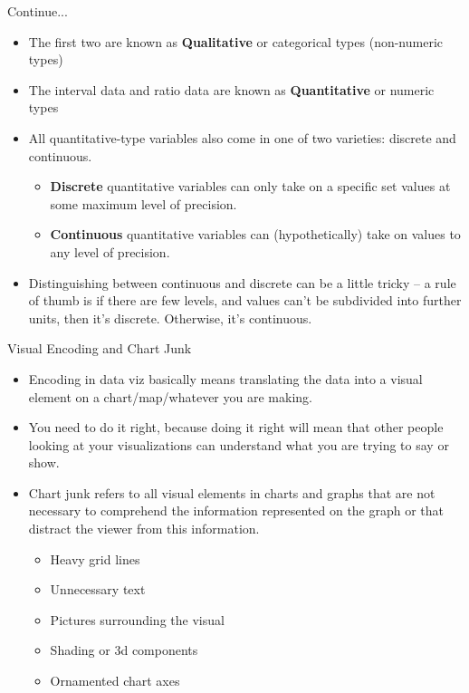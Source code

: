 \documentclass[12pt]{beamer}
\begin{document}
    \begin{frame}{Continue...}
    	\begin{itemize}
    		\item The first two are known as \textbf{Qualitative} or categorical types (non-numeric types)
    		\item The interval data and ratio data are known as \textbf{Quantitative} or numeric types 
    		\item All quantitative-type variables also come in one of two varieties: discrete and continuous.
    		\begin{itemize}
    			\item \textbf{Discrete} quantitative variables can only take on a specific set values at some maximum level of precision.
    			\item \textbf{Continuous} quantitative variables can (hypothetically) take on values to any level of precision.
    			 
    		\end{itemize}
    	    \item Distinguishing between continuous and discrete can be a little tricky – a rule of thumb is if there are few levels, and values can't be subdivided into further units, then it's discrete. Otherwise, it's continuous.
    	\end{itemize}
    \end{frame}
    \begin{frame}{Visual Encoding and Chart Junk}
    	\begin{itemize}
    		\item Encoding in data viz basically means translating the data into a visual element on a chart/map/whatever you are making.
    		\item You need to do it right, because doing it right will mean that other people looking at your visualizations can understand what you are trying to say or show.
    		\item Chart junk refers to all visual elements in charts and graphs that are not necessary to comprehend the information represented on the graph or that distract the viewer from this information.
    		\begin{itemize}
    			\item Heavy grid lines
    			\item Unnecessary text
    			\item Pictures surrounding the visual
    			\item Shading or 3d components
    			\item Ornamented chart axes
    		\end{itemize} 
    	\end{itemize}
    \end{frame}
\end{document}
